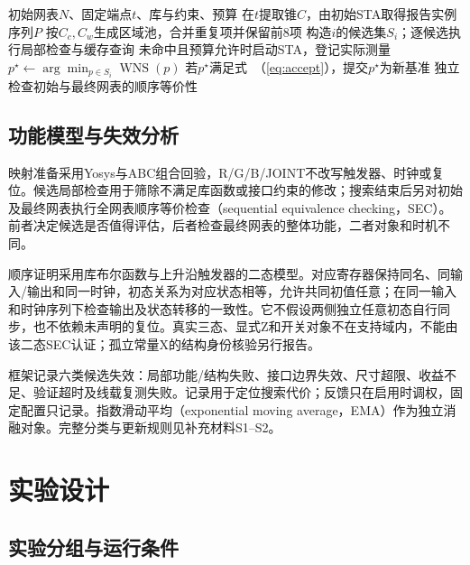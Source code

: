\documentclass[twocolumn,10pt,fontset=windows]{ctexart}
\renewcommand{\eqref}[1]{\textup{（\ref{#1}）}}
\begin{document}
\begin{algorithm}[htbp]
\footnotesize
\caption{覆盖优先候选搜索}\label{alg:search}
\begin{algorithmic}[1]
\Require 初始网表$N$、固定端点$t$、库与约束、预算
\State 在$t$提取锥$C$，由初始STA取得报告实例序列$P$
  \State 按$C_c,C_w$生成区域池，合并重复项并保留前8项
    \State 构造$i$的候选集$S_i$；逐候选执行局部检查与缓存查询
    \State 未命中且预算允许时启动STA，登记实际测量
    \State $p^\star\gets\arg\min_{p\in S_i}\operatorname{WNS}(p)$
    \State 若$p^\star$满足式~\eqref{eq:accept}，提交$p^\star$为新基准
  \EndFor
\EndWhile
\State 独立检查初始与最终网表的顺序等价性
\end{algorithmic}
\end{algorithm}

\subsection{功能模型与失效分析}\label{sec:validation}

映射准备采用Yosys与ABC\cite{abc}组合回验，R/G/B/JOINT不改写触发器、时钟或复位。候选局部检查用于筛除不满足库函数或接口约束的修改；搜索结束后另对初始及最终网表执行全网表顺序等价检查（sequential equivalence checking，SEC）。前者决定候选是否值得评估，后者检查最终网表的整体功能，二者对象和时机不同。

顺序证明采用库布尔函数与上升沿触发器的二态模型。对应寄存器保持同名、同输入/输出和同一时钟，初态关系为对应状态相等，允许共同初值任意；在同一输入和时钟序列下检查输出及状态转移的一致性。它不假设两侧独立任意初态自行同步，也不依赖未声明的复位。真实三态、显式Z和开关对象不在支持域内，不能由该二态SEC认证；孤立常量X的结构身份核验另行报告。

框架记录六类候选失效：局部功能/结构失败、接口边界失效、尺寸超限、收益不足、验证超时及线载复测失败。记录用于定位搜索代价；反馈只在启用时调权，固定配置只记录。指数滑动平均（exponential moving average，EMA）作为独立消融对象。完整分类与更新规则见补充材料S1--S2。

\section{实验设计}

\subsection{实验分组与运行条件}
\end{document}
